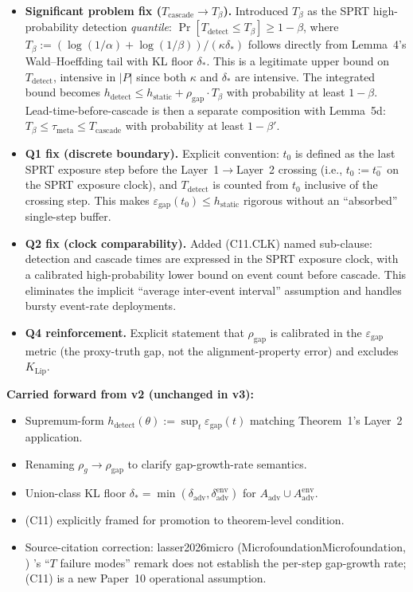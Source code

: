 \documentclass{article}
\makeatletter
\newcommand{\citep}[2][]{%
  \begingroup
  \def\@tmpkey{#2}%
  \ifx\@tmpkey\@empty\else
    (\ifx\@empty#1\@empty\else #1, \fi
     \@nameuse{bibkey@\@tmpkey})%
  \fi
  \endgroup
}
\newcommand{\Aadv}{A_{\mathrm{adv}}}
\newcommand{\deltaadv}{\delta_{\mathrm{adv}}}
\newcommand{\deltastar}{\delta_{*}}
\newcommand{\rhogap}{\rho_{\mathrm{gap}}}
\newcommand{\epsgap}{\varepsilon_{\mathrm{gap}}}
\newcommand{\Tbeta}{T_{\beta}}
\makeatother
\begin{document}
\begin{itemize}
\item \textbf{Significant problem fix
  ($T_{\mathrm{cascade}} \to \Tbeta$).}  Introduced
  $\Tbeta$ as the SPRT high-probability detection \emph{quantile}:
  $\Pr[T_{\mathrm{detect}} \leq \Tbeta] \geq 1-\beta$, where
  $\Tbeta := (\log(1/\alpha) + \log(1/\beta)) / (\kappa \deltastar)$
  follows directly from Lemma~4's Wald--Hoeffding tail with
  KL floor $\deltastar$.  This is a legitimate upper bound on
  $T_{\mathrm{detect}}$, intensive in $|P|$ since both $\kappa$ and
  $\deltastar$ are intensive.  The integrated bound becomes
  $h_{\mathrm{detect}} \leq h_{\mathrm{static}} + \rhogap \cdot
  \Tbeta$ with probability at least $1-\beta$.
  Lead-time-before-cascade is then a separate composition with
  Lemma~5d: $\Tbeta \leq \tau_{\mathrm{meta}} \leq T_{\mathrm{cascade}}$
  with probability at least $1-\beta'$.
\item \textbf{Q1 fix (discrete boundary).}  Explicit convention:
  $t_0$ is defined as the last SPRT exposure step before the
  Layer~1$\to$Layer~2 crossing (i.e., $t_0 := t_0^-$ on the SPRT
  exposure clock), and $T_{\mathrm{detect}}$ is counted from $t_0$
  inclusive of the crossing step.  This makes
  $\epsgap(t_0) \leq h_{\mathrm{static}}$ rigorous without an
  ``absorbed'' single-step buffer.
\item \textbf{Q2 fix (clock comparability).}  Added (C11.CLK)
  named sub-clause: detection and cascade times are expressed in
  the SPRT exposure clock, with a calibrated high-probability lower
  bound on event count before cascade.  This eliminates the
  implicit ``average inter-event interval'' assumption and handles
  bursty event-rate deployments.
\item \textbf{Q4 reinforcement.}  Explicit statement that $\rhogap$
  is calibrated in the $\epsgap$ metric (the proxy-truth gap, not
  the alignment-property error) and excludes $K_{\mathrm{Lip}}$.
\end{itemize}

\textbf{Carried forward from v2 (unchanged in v3):}
\begin{itemize}
\item Supremum-form $h_{\mathrm{detect}}(\theta) := \sup_t
  \epsgap(t)$ matching Theorem~1's Layer~2 application.
\item Renaming $\rho_g \to \rhogap$ to clarify gap-growth-rate
  semantics.
\item Union-class KL floor $\deltastar = \min(\deltaadv,
  \delta_{\mathrm{adv}}^{\mathrm{env}})$ for $\Aadv \cup
  \Aadv^{\mathrm{env}}$.
\item (C11) explicitly framed for promotion to theorem-level
  condition.
\item Source-citation correction:
  \citep[Microfoundation]{lasser2026micro}'s ``$T$ failure modes''
  remark does not establish the per-step gap-growth rate; (C11) is
  a new Paper~10 operational assumption.
\end{itemize}
\end{document}
